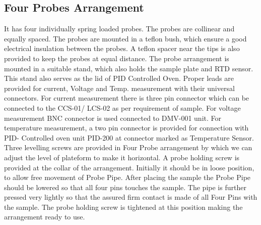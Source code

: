 \documentclass[%
 aip,
 amsmath,amssymb,
 reprint,%
]{revtex4-1}
\begin{document}
    \subsection{Four Probes Arrangement}
    It has four individually spring loaded probes. The probes are collinear and
    equally spaced. The probes are mounted in a teflon bush, which ensure a good
    electrical insulation between the probes. A teflon spacer near the tips is also provided
    to keep the probes at equal distance. The probe arrangement is mounted in a suitable
    stand, which also holds the sample plate and RTD sensor. This stand also serves as
    the lid of PID Controlled Oven. Proper leads are provided for current, Voltage and
    Temp. measurement with their universal connectors. For current measurement there is
    three pin connector which can be connected to the CCS-01/ LCS-02 as per
    requirement of sample. For voltage measurement BNC connector is used connected to
    DMV-001 unit. For temperature measurement, a two pin connector is provided for
    connection with PID- Controlled oven unit PID-200 at connector marked as
    Temperature Sensor. Three levelling screws are provided in Four Probe arrangement by which we can adjust the
    level of plateform to make it horizontal. A probe holding screw is provided at the collar of the
    arrangement. Initially it should be in loose position, to allow free movement of Probe Pipe.
    After placing the sample the Probe Pipe should be lowered so that all four pins touches the
    sample. The pipe is further pressed very lightly so that the assured firm contact is made of all Four
    Pins with the sample. The probe holding screw is tightened at this position making the arrangement ready to use.
\end{document}
